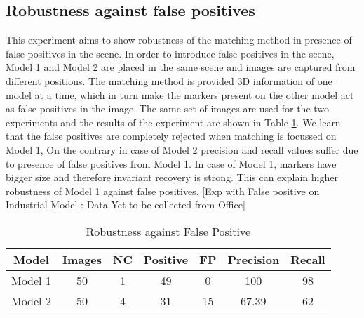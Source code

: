 \documentclass{bmvc2k}
\begin{document}
\subsection{Robustness against false positives}
This experiment aims to show robustness of the matching method in presence of false positives in the scene. 
In order to introduce false positives in the scene, Model 1 and Model 2 are placed in the same scene and images are captured from different positions. 
The matching method is provided 3D information of one model at a time, which in turn make the markers present on the other model act as false positives in the image. 
The same set of images are used for the two experiments and the results of the experiment are shown in Table \ref{tab:Exp3}.
We learn that the false positives are completely rejected when matching is focussed on Model 1, On the contrary in case of Model 2 precision and recall values suffer due to presence of false positives from Model 1. 
In case of Model 1, markers have bigger size and therefore invariant recovery is strong. This can explain higher robustness of Model 1 against false positives. 
[Exp with False positive on Industrial Model : Data Yet to be collected from Office]
\begin{table}
\centering
\caption{Robustness against False Positive } 
\begin{tabular}{ | c | c | c | c | c | c | c |}
\hline
Model & Images & NC & Positive & FP & Precision & Recall \\ \hline
Model 1 & 50 & 1  & 49 & 0  & 100 & 98 \\
Model 2 & 50 & 4 & 31 & 15  & 67.39 & 62 \\ \hline
\end{tabular} \\
\label{tab:Exp3}
\end{table}
\end{document}
